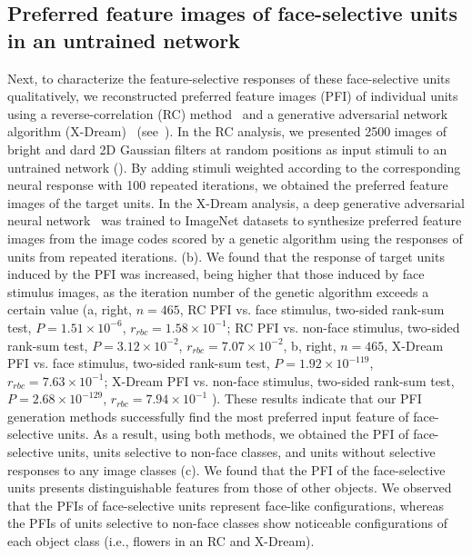 \documentclass[sn-mathphys]{sn-jnl}%
\theoremstyle{thmstyleone}%
\theoremstyle{thmstyletwo}%
\theoremstyle{thmstylethree}%
\begin{document}
\subsection{Preferred feature images of face-selective units in an untrained network}

Next, to characterize the feature-selective responses of these face-selective units qualitatively,
we reconstructed preferred feature images (PFI) of individual units using a reverse-correlation (RC) method~\cite{bonin2011local} and a generative adversarial network algorithm (X-Dream)~\cite{ponce2019evolving} (see~).
In the RC analysis, we presented 2500 images of bright and dard 2D Gaussian filters at random positions as input stimuli to an untrained network ().
By adding stimuli weighted according to the corresponding neural response with 100 repeated iterations, we obtained the preferred feature images of the target units.
In the X-Dream analysis, a deep generative adversarial neural network~\cite{dosovitskiy2016generating} was trained to ImageNet datasets to synthesize preferred feature images from the image codes scored by a genetic algorithm using the responses of units from repeated iterations. (b).
We found that the response of target units induced by the PFI was increased, being higher that those induced by face stimulus images, as the iteration number of the genetic algorithm exceeds a certain value 
(a, right, $ n=465 $, 
RC PFI vs. face stimulus, two-sided rank-sum test, $ P=1.51 \times 10^{-6} $, $ r_{rbc} = 1.58 \times 10^{-1} $;
RC PFI vs. non-face stimulus, two-sided rank-sum test, $ P=3.12 \times 10^{-2} $, $ r_{rbc} = 7.07 \times 10^{-2} $,
b, right, $ n=465 $, 
X-Dream PFI vs. face stimulus, two-sided rank-sum test, $ P=1.92 \times 10^{-119} $, $ r_{rbc} = 7.63 \times 10^{-1} $;
X-Dream PFI vs. non-face stimulus, two-sided rank-sum test, $ P = 2.68 \times 10^{-129} $, $ r_{rbc} = 7.94 \times 10^{-1} $
).
These results indicate that our PFI generation methods successfully find the most preferred input feature of face-selective units.
As a result, using both methods, we obtained the PFI of face-selective units, units selective to non-face classes, and units without selective responses to any image classes (c).
We found that the PFI of the face-selective units presents distinguishable features from those of other objects.
We observed that the PFIs of face-selective units represent face-like configurations, whereas the PFIs of units selective to non-face classes show noticeable configurations of each object class (i.e., flowers in an RC and X-Dream).
\end{document}

